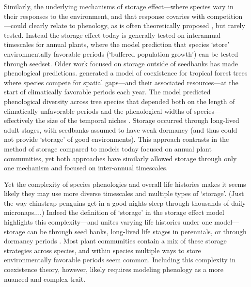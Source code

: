 \documentclass[11pt]{article}
\begin{document}
Similarly, the underlying mechanisms of storage effect---where species vary in their responses to the environment, and that response covaries with competition---could clearly relate to phenology, as is often theoretically proposed \citep{Chesson:1993gi,Chesson:2004eo}, but rarely tested. Instead the storage effect today is generally tested on interannual timescales for annual plants, where the model prediction that species `store' environmentally favorable periods (`buffered population growth') can be tested through seedset. Older work focused on storage outside of seedbanks has made phenological predictions. \citet{Kubo:1996qe} generated a model of coexistence for tropical forest trees where species compete for spatial gaps---and their associated resources---at the start of climatically favorable periods each year. The model predicted phenological diversity across tree species that depended both on the length of climatically unfavorable periods and the phenological widths of species---effectively the size of the temporal niches \citep{Kubo:1996qe}. Storage occurred through long-lived adult stages, with seedbanks assumed to have weak dormancy (and thus could not provide `storage' of good environments). This approach contrasts in the method of storage compared to models today focused on annual plant communities, yet both approaches have similarly allowed storage through only one mechanism and focused on inter-annual timescales.

Yet the complexity of species phenologies and overall life histories makes it seems likely they may use more diverse timescales and multiple types of `storage'. (Just the way chinstrap penguins get in a good nights sleep through thousands of daily micronaps....)  Indeed the definition of `storage' in the storage effect model highlights this complexity---and unites varying life histories under one model---storage can be through seed banks, long-lived life stages in perennials, or through dormancy periods \citep{Chesson:2000vd}. Most plant communities contain a mix of these storage strategies across species, and within species multiple ways to store environmentally favorable periods seem common. Including this complexity in coexistence theory, however, likely requires modeling phenology as a more nuanced and complex trait. 
\end{document}
